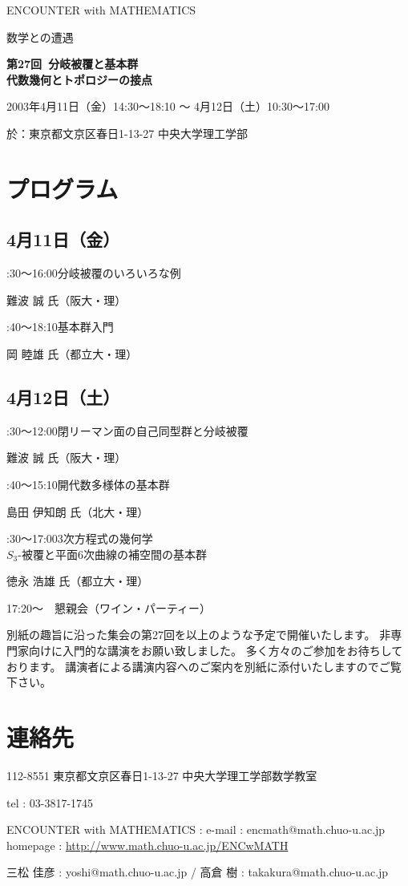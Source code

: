 \documentclass[uplatex,dvipdfmx]{jlreq}
\newcommand{\talk}[3]{%
\noindent
#1\quad #2\par
\hspace*{2em}#3\par\smallskip
}
\newcommand{\EwMnumber}{第27回}
\newcommand{\EwMtitle}{分岐被覆と基本群\\[2mm]\large 代数幾何とトポロジーの接点}
\newcommand{\EwMdate}{2003年4月11日（金）14:30～18:10 ～ 4月12日（土）10:30～17:00}
\newcommand{\EwMplace}{東京都文京区春日1-13-27 中央大学理工学部}
\newcommand{\EwMtitleblock}{

\vspace*{-5mm}

\begin{center}

{\Large ENCOUNTER with MATHEMATICS}

\vspace{2mm}

{\large 数学との遭遇}

\vspace{4mm}

{\Large \bfseries \EwMnumber\ \EwMtitle}

\vspace{4mm}

\EwMdate

\vspace{2mm}

於：\EwMplace

\end{center}

\vspace{2mm}

}
\begin{document}
\EwMtitleblock


\section*{プログラム}

\subsection*{4月11日（金）}

\talk
{14:30～16:00}
{分岐被覆のいろいろな例}
{難波 誠 氏（阪大・理）}

\talk
{16:40～18:10}
{基本群入門}
{岡 睦雄 氏（都立大・理）}

\subsection*{4月12日（土）}

\talk
{10:30～12:00}
{閉リーマン面の自己同型群と分岐被覆}
{難波 誠 氏（阪大・理）}

\talk
{13:40～15:10}
{開代数多様体の基本群}
{島田 伊知朗 氏（北大・理）}

\talk
{15:30～17:00}
{3次方程式の幾何学\\[1mm]$S_3$-被覆と平面6次曲線の補空間の基本群}
{徳永 浩雄 氏（都立大・理）}

\bigskip

17:20～　懇親会（ワイン・パーティー）


\bigskip

別紙の趣旨に沿った集会の第27回を以上のような予定で開催いたします。  
非専門家向けに入門的な講演をお願い致しました。  
多く方々のご参加をお待ちしております。  
講演者による講演内容へのご案内を別紙に添付いたしますのでご覧下さい。


\section*{連絡先}

112-8551 東京都文京区春日1-13-27 中央大学理工学部数学教室 

tel : 03-3817-1745  

ENCOUNTER with MATHEMATICS : e-mail : encmath@math.chuo-u.ac.jp  
homepage : \url{http://www.math.chuo-u.ac.jp/ENCwMATH}  

三松 佳彦 : yoshi@math.chuo-u.ac.jp / 高倉 樹 : takakura@math.chuo-u.ac.jp
\end{document}
